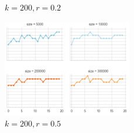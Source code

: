 \documentclass{article}
\begin{document}
\begin{multicols}{2}
\begin{figure}[H]
			\caption{\(k=200, r=0.2\)}
	  		\label{fig:walk200ksnp02}
  		\end{figure}
  		\begin{figure}[H]
			\center
			\includegraphics[width=\linewidth, height=120pt]{data/walk_Ng20_k200_snp_05.png}
			\caption{\(k=200, r=0.5\)}
	  		\label{fig:walk200ksnp05}
  		\end{figure}
  		\end{multicols}	
\end{document}
